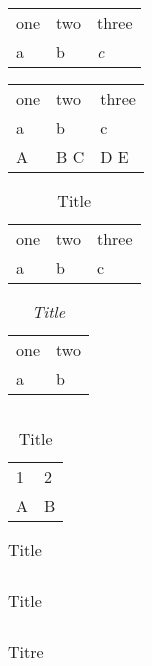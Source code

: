 \begin{tabular}{lll}
one & two & three \\
a & b & \emph{c} \\
\end{tabular}
\begin{tabular}{lll}
one & two & three \\
a & b & c \\
A & B 
C & D
E \\
\end{tabular}
\begin{table}[htbp]
\begin{tabular}{lll}
one & two & three \\
a & b & c \\
\end{tabular}
\caption{Title}
\label{tbl:1}
\end{table}
\setcounter{tocdepth}{3}
\listoftables
\begin{table}[htbp]
\begin{tabular}{ll}
one & two \\
a & b \\
\end{tabular}
\caption{\emph{Title}}
\label{tbl:2}
\end{table}
\begin{tabular}{}
\end{tabular}
\begin{table}[htbp]
\begin{tabular}{ll}
1 & 2 \\
A & B \\
\end{tabular}
\caption{Title}
\label{tbl:3}
\end{table}
\begin{table}[htbp]
\begin{tabular}{}
\end{tabular}
\caption{Title}
\label{tbl:4}
\end{table}
\begin{table}[htbp]
\begin{tabular}{}

\end{tabular}
\caption{Title}
\label{tbl:5}
\end{table}
\begin{table}[htbp]
\begin{tabular}{}
\end{tabular}
\caption{Titre}
\label{tbl:6}
\end{table}
